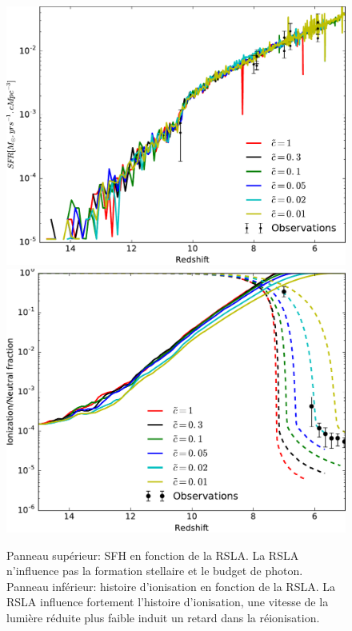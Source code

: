 \begin{figure}
        \includegraphics[height=.3\textheight]{img/04_mapreio/SFR.pdf} 
        \includegraphics[height=.3\textheight]{img/04_mapreio/xion.pdf} 
        \caption[Redshift de réionisation en fonction de la RSLA]{
		Panneau supérieur: \ac{SFH} en fonction de la \ac{RSLA}.
		La \ac{RSLA} n'influence pas la formation stellaire et le budget de photon.
		Panneau inférieur: histoire d'ionisation en fonction de la \ac{RSLA}.
		La \ac{RSLA} influence fortement l'histoire d'ionisation, une vitesse de la lumière réduite plus faible induit un retard dans la réionisation.
 		\label{fig:zrsla}}
\end{figure}




